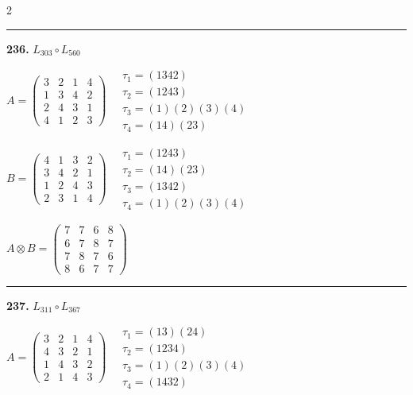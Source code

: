 \begin{multicols}{2}
\vspace{0.3em}
\hrule
\vspace{0.3em}

\noindent\textbf{236.} $L_{303} \circ L_{560}$

$A = \begin{pmatrix} 3 & 2 & 1 & 4 \\ 1 & 3 & 4 & 2 \\ 2 & 4 & 3 & 1 \\ 4 & 1 & 2 & 3 \end{pmatrix} \quad \begin{matrix} \tau_{1}=(1 3 4 2) \\ \tau_{2}=(1 2 4 3) \\ \tau_{3}=(1)(2)(3)(4) \\ \tau_{4}=(1 4)(2 3) \end{matrix}$

$B = \begin{pmatrix} 4 & 1 & 3 & 2 \\ 3 & 4 & 2 & 1 \\ 1 & 2 & 4 & 3 \\ 2 & 3 & 1 & 4 \end{pmatrix} \quad \begin{matrix} \tau_{1}=(1 2 4 3) \\ \tau_{2}=(1 4)(2 3) \\ \tau_{3}=(1 3 4 2) \\ \tau_{4}=(1)(2)(3)(4) \end{matrix}$

$A \otimes B = \begin{pmatrix} 7 & 7 & 6 & 8 \\ 6 & 7 & 8 & 7 \\ 7 & 8 & 7 & 6 \\ 8 & 6 & 7 & 7 \end{pmatrix}$

\vspace{0.3em}
\hrule
\vspace{0.3em}

\noindent\textbf{237.} $L_{311} \circ L_{367}$

$A = \begin{pmatrix} 3 & 2 & 1 & 4 \\ 4 & 3 & 2 & 1 \\ 1 & 4 & 3 & 2 \\ 2 & 1 & 4 & 3 \end{pmatrix} \quad \begin{matrix} \tau_{1}=(1 3)(2 4) \\ \tau_{2}=(1 2 3 4) \\ \tau_{3}=(1)(2)(3)(4) \\ \tau_{4}=(1 4 3 2) \end{matrix}$


\end{multicols}
